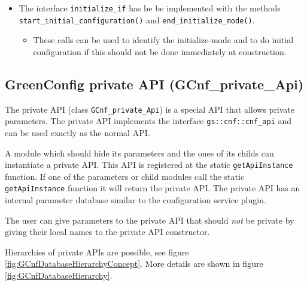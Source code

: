 \begin{itemize}
	\item The interface \lstinline|initialize_if| has be be implemented with the methods \newline\mbox{\lstinline|start_initial_configuration()|} and \lstinline|end_initialize_mode()|.

	\begin{itemize}
		\item These calls can be used to identify the initialize-mode and to do initial configuration if this should not be done immediately at construction.
	\end{itemize}

\end{itemize}


\subsection{GreenConfig private API (GCnf\_private\_Api)}
\label{GCnfPrivateApi}

The \GreenConfig private API (class \lstinline|GCnf_private_Api|) is a special API that allows private parameters. The private API implements the interface \lstinline|gs::cnf::cnf_api| and can be used exactly as the normal API.

A module which should hide its parameters and the ones of its childs can instantiate a private API. This API is registered at the static \lstinline|getApiInstance| function. If one of the parameters or child modules call the static \lstinline|getApiInstance| function it will return the private API. The private API has an internal parameter database similar to the configuration service plugin.

The user can give parameters to the private API that should {\em not} be private by giving their local names to the private API constructor.

Hierarchies of private APIs are possible, see figure \ref{fig:GCnfDatabaseHierarchyConcept}. More details are shown in figure \ref{fig:GCnfDatabaseHierarchy}.

